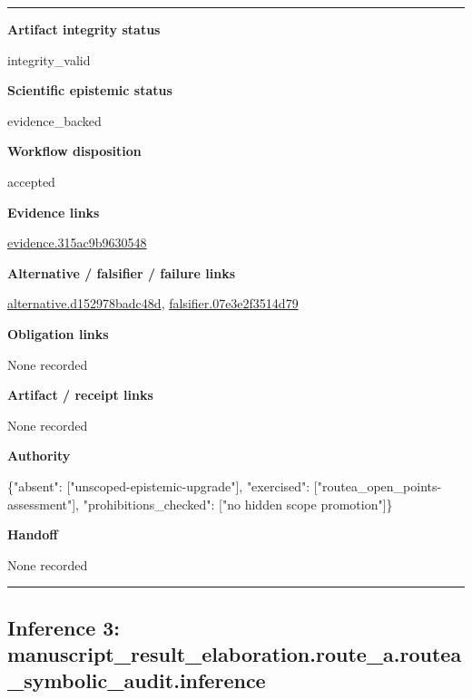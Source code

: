 \documentclass[10pt,a4paper]{article}
\newcommand{\TraceField}[2]{\par\noindent\textbf{#1}\par\noindent #2\par\smallskip}
\newenvironment{TraceDossier}{\par\medskip\noindent\hrule\medskip}{\medskip\hrule\par\medskip}
\begin{document}
\begin{TraceDossier}
\TraceField{Artifact integrity status}{integrity\_\allowbreak{}valid}

\TraceField{Scientific epistemic status}{evidence\_\allowbreak{}backed}

\TraceField{Workflow disposition}{accepted}

\TraceField{Evidence links}{\hyperlink{trace-evidence-e624d4912036fdc283}{evidence.\allowbreak{}315ac9b963\allowbreak{}0548}}

\TraceField{Alternative / falsifier / failure links}{\hyperlink{trace-alternative-9ec878e8af2a38b106}{alternativ\allowbreak{}e.\allowbreak{}d152978bad\allowbreak{}c48d}, \hyperlink{trace-alternative-d9fe3d5c44ae1a6f1e}{falsifier.\allowbreak{}07e3e2f351\allowbreak{}4d79}}

\TraceField{Obligation links}{None recorded}

\TraceField{Artifact / receipt links}{None recorded}

\TraceField{Authority}{\{"absent":\allowbreak{} ["unscoped\allowbreak{}-\allowbreak{}epistemic-\allowbreak{}upgrade"],\allowbreak{} "exercised\allowbreak{}":\allowbreak{} ["routea\_\allowbreak{}open\_\allowbreak{}points-\allowbreak{}assessment\allowbreak{}"], "prohibiti\allowbreak{}ons\_\allowbreak{}checked":\allowbreak{} ["no hidden scope promotion"\allowbreak{}]\}}

\TraceField{Handoff}{None recorded}

\end{TraceDossier}
\pagebreak[2]\subsection{Inference 3: manuscript\allowbreak{}\_\allowbreak{}result\_\allowbreak{}elaboratio\allowbreak{}n.\allowbreak{}route\_\allowbreak{}a.\allowbreak{}routea\_\allowbreak{}symbolic\_\allowbreak{}audit.\allowbreak{}inference}\label{trace-inference-68439caf913a4f3466}
\end{document}
